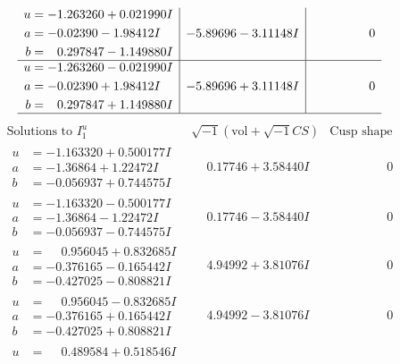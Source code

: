 \documentclass[1p]{elsarticle_modified}
\theoremstyle{definition}
\newcommand{\I}{\sqrt{-1}}
\begin{document}
$$\begin{array}{c|c|c}
\begin{aligned}
u &= -1.263260 + 0.021990 I \\
a &= -0.02390 - 1.98412 I \\
b &= \phantom{-}0.297847 - 1.149880 I\end{aligned}
 & -5.89696 - 3.11148 I & \phantom{-0.000000 } 0 \\ \hline\begin{aligned}
u &= -1.263260 - 0.021990 I \\
a &= -0.02390 + 1.98412 I \\
b &= \phantom{-}0.297847 + 1.149880 I\end{aligned}
 & -5.89696 + 3.11148 I & \phantom{-0.000000 } 0\\
 \hline 
 \end{array}$$\newpage$$\begin{array}{c|c|c}  
\text{Solutions to }I^u_{1}& \I (\text{vol} + \sqrt{-1}CS) & \text{Cusp shape}\\
 \hline 
\begin{aligned}
u &= -1.163320 + 0.500177 I \\
a &= -1.36864 + 1.22472 I \\
b &= -0.056937 + 0.744575 I\end{aligned}
 & \phantom{-}0.17746 + 3.58440 I & \phantom{-0.000000 } 0 \\ \hline\begin{aligned}
u &= -1.163320 - 0.500177 I \\
a &= -1.36864 - 1.22472 I \\
b &= -0.056937 - 0.744575 I\end{aligned}
 & \phantom{-}0.17746 - 3.58440 I & \phantom{-0.000000 } 0 \\ \hline\begin{aligned}
u &= \phantom{-}0.956045 + 0.832685 I \\
a &= -0.376165 - 0.165442 I \\
b &= -0.427025 - 0.808821 I\end{aligned}
 & \phantom{-}4.94992 + 3.81076 I & \phantom{-0.000000 } 0 \\ \hline\begin{aligned}
u &= \phantom{-}0.956045 - 0.832685 I \\
a &= -0.376165 + 0.165442 I \\
b &= -0.427025 + 0.808821 I\end{aligned}
 & \phantom{-}4.94992 - 3.81076 I & \phantom{-0.000000 } 0 \\ \hline\begin{aligned}
u &= \phantom{-}0.489584 + 0.518546 I \\

\end{aligned}
\end{array}$$
\end{document}
